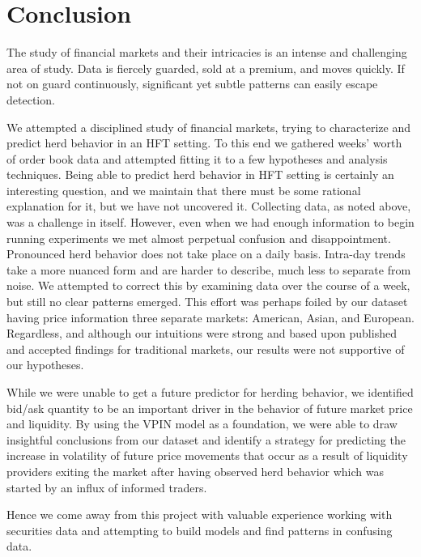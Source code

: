 \section{Conclusion}%
\label{conclusion}
The study of financial markets and their intricacies is an intense and challenging area of study.
Data is fiercely guarded, sold at a premium, and moves quickly.
If not on guard continuously, significant yet subtle patterns can easily escape detection.

We attempted a disciplined study of financial markets, trying to characterize and predict herd behavior in an HFT setting.
To this end we gathered weeks' worth of order book data and attempted fitting it to a few hypotheses and analysis techniques.
Being able to predict herd behavior in HFT setting is certainly an interesting question, and we maintain that there must be some rational explanation for it, but we have not uncovered it.
Collecting data, as noted above, was a challenge in itself.
However, even when we had enough information to begin running experiments we met almost perpetual confusion and disappointment. 
Pronounced herd behavior does not take place on a daily basis.
Intra-day trends take a more nuanced form and are harder to describe, much less to separate from noise.
We attempted to correct this by examining data over the course of a week, but still no clear patterns emerged.
This effort was perhaps foiled by our dataset having price information three separate markets: American, Asian, and European.
Regardless, and although our intuitions were strong and based upon published and accepted findings for traditional markets, our results were not supportive of our hypotheses.

While we were unable to get a future predictor for herding behavior, we identified bid/ask quantity to be an important driver in the behavior of future market price and liquidity.
By using the VPIN model as a foundation, we were able to draw insightful conclusions from our dataset and identify a strategy for predicting the increase in volatility of
future price movements that occur as a result of liquidity providers exiting the market
after having observed herd behavior which was started by an influx of informed traders.

Hence we come away from this project with valuable experience working with securities data and attempting to build models and find patterns in confusing data.
